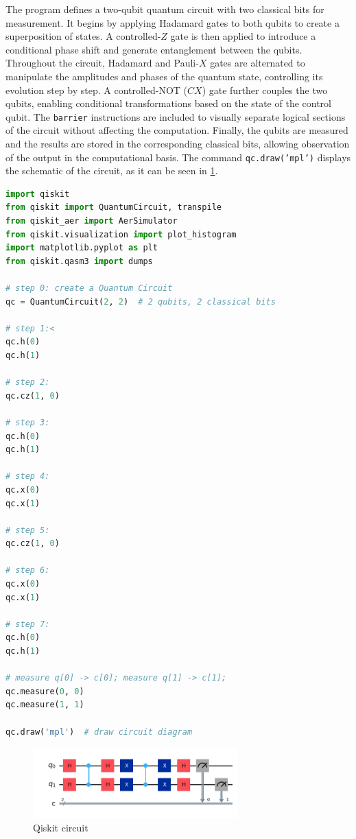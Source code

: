 The program defines a two-qubit quantum circuit with two classical bits for measurement. It begins by applying Hadamard gates to both qubits to create a superposition of states. A controlled-$Z$ gate is then applied to introduce a conditional phase shift and generate entanglement between the qubits. Throughout the circuit, Hadamard and Pauli-$X$ gates are alternated to manipulate the amplitudes and phases of the quantum state, controlling its evolution step by step. A controlled-NOT ($CX$) gate further couples the two qubits, enabling conditional transformations based on the state of the control qubit. The \texttt{barrier} instructions are included to visually separate logical sections of the circuit without affecting the computation. Finally, the qubits are measured and the results are stored in the corresponding classical bits, allowing observation of the output in the computational basis. The command \texttt{qc.draw('mpl')} displays the schematic of the circuit, as it can be seen in \cref{fig:qiskit circuit}.

\vspace{0.5cm}
\begin{lstlisting}[language=Python, caption={Qiskit code}, label={lst:qiskit-circuit}]
import qiskit
from qiskit import QuantumCircuit, transpile
from qiskit_aer import AerSimulator
from qiskit.visualization import plot_histogram
import matplotlib.pyplot as plt
from qiskit.qasm3 import dumps

# step 0: create a Quantum Circuit
qc = QuantumCircuit(2, 2)  # 2 qubits, 2 classical bits

# step 1:<
qc.h(0)
qc.h(1)

# step 2:
qc.cz(1, 0)

# step 3:
qc.h(0)
qc.h(1)

# step 4:
qc.x(0)
qc.x(1)

# step 5:
qc.cz(1, 0)

# step 6:
qc.x(0)
qc.x(1)

# step 7:
qc.h(0)
qc.h(1)

# measure q[0] -> c[0]; measure q[1] -> c[1];
qc.measure(0, 0)
qc.measure(1, 1)

qc.draw('mpl')  # draw circuit diagram
\end{lstlisting}





\begin{figure}[H]
    \centering
    \includegraphics[width=0.7\textwidth]{images/circuit.png}
    \caption{Qiskit circuit}
    \label{fig:qiskit circuit}
\end{figure}



